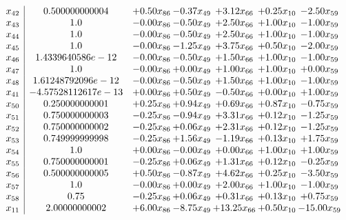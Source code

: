 \documentclass[8pt]{article}
\begin{document}
\[\begin{array}{c| c c@{\hskip 2pt} c@{\hskip 2pt} c@{\hskip 2pt} c@{\hskip 2pt} c@{\hskip 2pt} }
 x_{42}   &  0.500000000004 & +  0.50 x_{86} & -0.37 x_{49} & +  3.12 x_{66} & +  0.25 x_{10} & -2.50 x_{59}\\
 x_{43}   &  1.0 & -0.00 x_{86} & -0.50 x_{49} & +  2.50 x_{66} & +  1.00 x_{10} & -1.00 x_{59}\\
 x_{44}   &  1.0 & -0.00 x_{86} & -0.50 x_{49} & +  2.50 x_{66} & +  1.00 x_{10} & -1.00 x_{59}\\
 x_{45}   &  1.0 & -0.00 x_{86} & -1.25 x_{49} & +  3.75 x_{66} & +  0.50 x_{10} & -2.00 x_{59}\\
 x_{46}   &  1.4339640586e-12 & -0.00 x_{86} & -0.50 x_{49} & +  1.50 x_{66} & +  1.00 x_{10} & -1.00 x_{59}\\
 x_{47}   &  1.0 & -0.00 x_{86} & +  0.00 x_{49} & +  1.00 x_{66} & +  1.00 x_{10} & +  0.00 x_{59}\\
 x_{48}   &  1.61248792096e-12 & -0.00 x_{86} & -0.50 x_{49} & +  1.50 x_{66} & +  1.00 x_{10} & -1.00 x_{59}\\
 x_{41}   &  -4.57528112617e-13 & +  0.00 x_{86} & +  0.50 x_{49} & -0.50 x_{66} & +  0.00 x_{10} & +  1.00 x_{59}\\
 x_{50}   &  0.250000000001 & +  0.25 x_{86} & +  0.94 x_{49} & +  0.69 x_{66} & +  0.87 x_{10} & -0.75 x_{59}\\
 x_{51}   &  0.750000000003 & -0.25 x_{86} & -0.94 x_{49} & +  3.31 x_{66} & +  0.12 x_{10} & -1.25 x_{59}\\
 x_{52}   &  0.750000000002 & -0.25 x_{86} & +  0.06 x_{49} & +  2.31 x_{66} & +  0.12 x_{10} & -1.25 x_{59}\\
 x_{53}   &  0.749999999998 & -0.25 x_{86} & +  1.56 x_{49} & -1.19 x_{66} & +  0.13 x_{10} & +  1.75 x_{59}\\
 x_{54}   &  1.0 & +  0.00 x_{86} & -0.00 x_{49} & +  0.00 x_{66} & +  1.00 x_{10} & +  1.00 x_{59}\\
 x_{55}   &  0.750000000001 & -0.25 x_{86} & +  0.06 x_{49} & +  1.31 x_{66} & +  0.12 x_{10} & -0.25 x_{59}\\
 x_{56}   &  0.500000000005 & +  0.50 x_{86} & -0.87 x_{49} & +  4.62 x_{66} & +  0.25 x_{10} & -3.50 x_{59}\\
 x_{57}   &  1.0 & -0.00 x_{86} & +  0.00 x_{49} & +  2.00 x_{66} & +  1.00 x_{10} & -1.00 x_{59}\\
 x_{58}   &  0.75 & -0.25 x_{86} & +  0.06 x_{49} & +  0.31 x_{66} & +  0.13 x_{10} & +  0.75 x_{59}\\
 x_{11}   &  2.00000000002 & +  6.00 x_{86} & -8.75 x_{49} & + 13.25 x_{66} & +  0.50 x_{10} & -15.00 x_{59}\\

\end{array}\]
\end{document}
